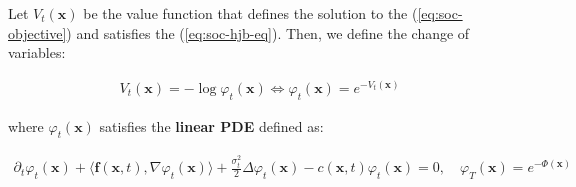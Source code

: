 \documentclass{article}
\begin{document}
\begin{corollary}\label{cor:hopf-cole-value}
    Let $V_t(\boldsymbol{x})$ be the value function that defines the solution to the (\ref{eq:soc-objective}) and satisfies the (\ref{eq:soc-hjb-eq}). Then, we define the change of variables:
    \begin{small}
    \begin{align}
        V_t(\boldsymbol{x})=-\log \varphi_t(\boldsymbol{x}) \iff \varphi_t(\boldsymbol{x}) =e^{-V_t(\boldsymbol{x})}\label{eq:hopf-cole-value-variable}
    \end{align}
    \end{small}
    where $\varphi_t(\boldsymbol{x})$ satisfies the \textbf{linear PDE} defined as:
    \begin{small}
    \begin{align}
        \partial_t\varphi_t(\boldsymbol{x})+\langle\boldsymbol{f}(\boldsymbol{x},t),\nabla \varphi_t(\boldsymbol{x})\rangle+\frac{\sigma_t^2}{2}\Delta\varphi_t(\boldsymbol{x})-c(\boldsymbol{x},t)\varphi_t(\boldsymbol{x})=0, \quad \varphi_T(\boldsymbol{x})=e^{-\Phi(\boldsymbol{x})}\tag{Hopf-Cole Value PDE}\label{eq:hopf-cole-value-pde}
    \end{align}
    \end{small}
\end{corollary}
\end{document}
